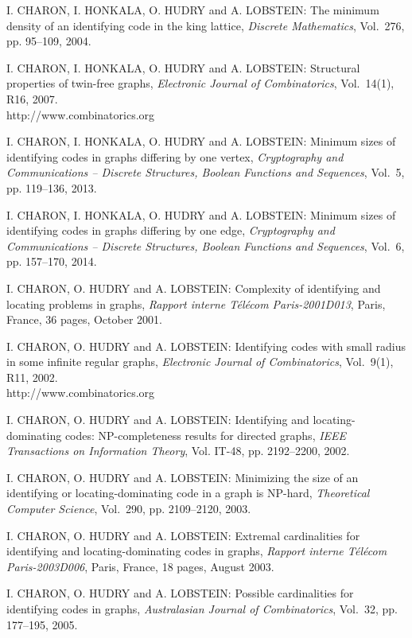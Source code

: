 \begin{thebibliography}{999}
I. CHARON, I. HONKALA, O. HUDRY and A. LOBSTEIN: The minimum density of an identifying code in the king lattice, {\it Discrete Mathematics}, Vol.~276, pp. 95--109, 2004.

I. CHARON, I. HONKALA, O. HUDRY and A. LOBSTEIN: Structural properties of twin-free graphs, {\it Electronic Journal of Combinatorics}, Vol.~14(1), R16, 2007.\\
http://www.combinatorics.org

I. CHARON, I. HONKALA, O. HUDRY and A. LOBSTEIN: Minimum sizes of identifying codes in graphs differing by one vertex, {\it Cryptography and Communications -- Discrete Structures, Boolean Functions and Sequences}, Vol.~5, pp. 119--136, 2013.

I. CHARON, I. HONKALA, O. HUDRY and A. LOBSTEIN: Minimum sizes of identifying codes in graphs differing by one edge, {\it Cryptography and Communications -- Discrete Structures, Boolean Functions and Sequences}, Vol.~6, pp. 157--170, 2014.

I. CHARON, O. HUDRY and A. LOBSTEIN: Complexity of identifying and locating problems in graphs, {\it Rapport interne T\'el\'ecom Paris-2001D013}, Paris, France, 36 pages, October 2001.

I. CHARON, O. HUDRY and A. LOBSTEIN: Identifying codes with small radius in some infinite regular graphs, {\it Electronic Journal of Combinatorics}, Vol.~9(1), R11, 2002.\\
http://www.combinatorics.org

I. CHARON, O. HUDRY and A. LOBSTEIN: Identifying and locating-dominating codes: NP-completeness results for directed graphs, {\it IEEE Transactions on Information Theory}, Vol. IT-48, pp. 2192--2200, 2002.

I. CHARON, O. HUDRY and A. LOBSTEIN: Minimizing the size of an identifying or locating-dominating code in a graph is NP-hard, {\it Theoretical Computer Science}, Vol.~290, pp. 2109--2120, 2003.

I. CHARON, O. HUDRY and A. LOBSTEIN: Extremal cardinalities for identifying and locating-dominating codes in graphs, {\it Rapport interne T\'el\'ecom Paris-2003D006}, Paris, France, 18 pages, August 2003.

I. CHARON, O. HUDRY and A. LOBSTEIN: Possible cardinalities for identifying codes in graphs, {\it Australasian Journal of Combinatorics}, Vol.~32, pp. 177--195, 2005.


\end{thebibliography}
